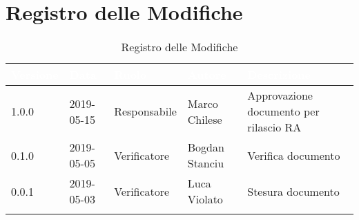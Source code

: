 \newpage

\section*{Registro delle Modifiche}

\begin{center}
\begin{longtable}[c]{|m{}|m{}|m{}|m{}|p{}|}
\hline
\rowcolor{bluelogo}\textbf{\textcolor{white}{Versione}} & \textbf{\textcolor{white}{Data}} & \textbf{\textcolor{white}{Ruolo}} & \textbf{\textcolor{white}{Autore}} & \textbf{\textcolor{white}{Descrizione}}\\
\hline \hline
\endfirsthead
1.0.0 & 2019-05-15 & Responsabile & Marco Chilese & Approvazione documento per rilascio RA  \\
\hline
\rowcolor{grigio} 0.1.0 & 2019-05-05 & Verificatore & Bogdan Stanciu & Verifica documento \\
\hline
0.0.1 & 2019-05-03 & Verificatore & Luca Violato & Stesura documento \\
\hline
\caption{Registro delle Modifiche}
\end{longtable}
\end{center}
